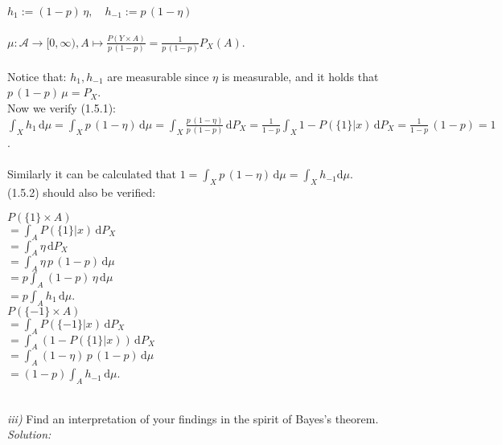 \documentclass{article}
\begin{document}
\indent $h_1 := (1-p)\, \eta, \quad h_{-1}:= p\, (1-\eta) \quad $\\
\vspace*{-1em} \\
\indent $\mu : \mathcal{A} \rightarrow [0,\infty) , A \mapsto \displaystyle{ \frac{P(Y\times A)}{p\, (1-p)} = \frac{1}{p\, (1-p)} P_X(A) }$.\\
\vspace*{-1.3em} \\
Notice that:  $h_1, h_{-1}$ are measurable since $\eta$ is measurable, and it holds that $p\, (1-p)\, \mu = P_X$. \\
Now we verify (1.5.1): \\
\indent $\displaystyle{ \int_X h_1 \, \text{d}\mu = \int_X p\, (1-\eta) \, \text{d}\mu = \int_X \frac{p\, (1-\eta)}{p\, (1-p)} \, \text{d}P_X = \frac{1}{1-p}\int_X 1-P(\{1\}|x)\, \text{d}P_X = \frac{1}{1-p} \,(1-p) = 1 }$.\\
\vspace*{-0.5em} \\
Similarly it can be calculated that $ \displaystyle{  1 = \int_X p\, (1-\eta)\,\text{d} \mu = \int_X h_{-1} \text{d} \mu }$.\vspace*{0.6em}\\
(1.5.2) should also be verified\vspace*{-0.3em}: 
\begin{multicols}{2}
\indent \indent \indent $ P( \{1\} \times A ) $ \vspace*{0.5em} \\
\indent \indent $= \displaystyle{ \int_A P(\{1\} | x )\, \text{d}  P_X }$\vspace*{0.5em}\\
\indent \indent $\displaystyle{= \int_A \eta \, \text{d} P_X }$\vspace*{0.5em}\\
\indent \indent $\displaystyle{= \int_A \eta\, p\, (1-p)\, \text{d} \mu }$\vspace*{0.5em}\\
\indent \indent $\displaystyle{= p\int_A (1-p)\, \eta \, \text{d} \mu }$\vspace*{0.5em}\\
\indent \indent $\displaystyle{= p \int_A h_1\, \text{d} \mu } $.\\
\indent \indent \indent  $ P( \{-1\} \times A ) $\vspace*{0.5em}\\
\indent \indent $= \displaystyle{ \int_A P(\{-1\} | x )\, \text{d}  P_X }$\vspace*{0.5em}\\
\indent \indent $= \displaystyle{ \int_A (1-P(\{1\} | x )  ) \, \text{d} P_X }$\vspace*{0.5em}\\
\indent \indent  $= \displaystyle{ \int_A (1- \eta)\, p\, (1-p)\, \text{d} \mu  } $\vspace*{0.5em}\\
\indent \indent $= \displaystyle{ (1-p)\int_A h_{-1} \, \text{d} \mu   }$.\\
\\
\end{multicols}
\textsl{iii)} Find an interpretation of your findings in the spirit of Bayes's theorem. \\
\textsl{Solution:}   \\
\end{document}
